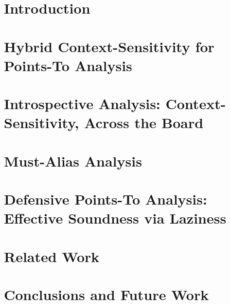 \documentclass[ack,preface]{diphdthesis}
\begin{document}
\frontmatter

\mainmatter

\chapter{Introduction}


\chapter{Hybrid Context-Sensitivity for Points-To Analysis}


\chapter{Introspective Analysis: Context-Sensitivity,
Across the Board}


\chapter{Must-Alias Analysis}


\chapter{Defensive Points-To Analysis: Effective Soundness via
Laziness}


\chapter{Related Work}
%

\chapter{Conclusions and Future Work}
%

\backmatter
\end{document}
